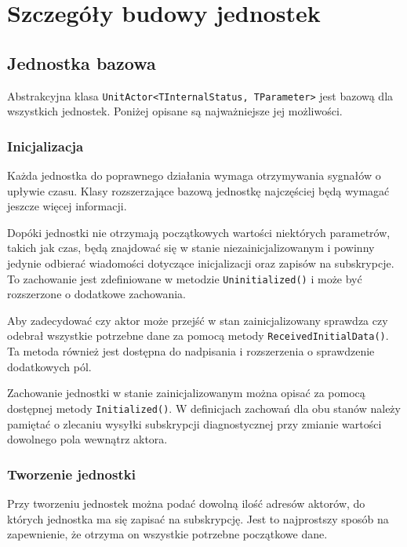 \chapter{Szczegóły budowy jednostek} \label{ch:unit}

\section{Jednostka bazowa}
Abstrakcyjna klasa \lstinline{UnitActor<TInternalStatus, TParameter>} jest bazową dla wszystkich jednostek. Poniżej opisane są najważniejsze jej możliwości.

\subsection*{Inicjalizacja}
Każda jednostka do poprawnego działania wymaga otrzymywania sygnałów o upływie czasu. Klasy rozszerzające bazową jednostkę najczęściej będą wymagać jeszcze więcej informacji. 

Dopóki jednostki nie otrzymają początkowych wartości niektórych parametrów, takich jak czas, będą znajdować się w stanie niezainicjalizowanym i powinny jedynie odbierać wiadomości dotyczące inicjalizacji oraz zapisów na subskrypcje.
To zachowanie jest zdefiniowane w metodzie \lstinline{Uninitialized()} i może być rozszerzone o dodatkowe zachowania.

Aby zadecydować czy aktor może przejść w stan zainicjalizowany sprawdza czy odebrał wszystkie potrzebne dane za pomocą metody \lstinline{ReceivedInitialData()}. Ta metoda również jest dostępna do nadpisania i rozszerzenia o sprawdzenie dodatkowych pól.

Zachowanie jednostki w stanie zainicjalizowanym można opisać za pomocą dostępnej metody \lstinline{Initialized()}. 
W definicjach zachowań dla obu stanów należy pamiętać o zlecaniu wysyłki subskrypcji diagnostycznej przy zmianie wartości dowolnego pola wewnątrz aktora.

\subsection*{Tworzenie jednostki}
Przy tworzeniu jednostek można podać dowolną ilość adresów aktorów, do których jednostka ma się zapisać na subskrypcję. Jest to najprostszy sposób na zapewnienie, że otrzyma on wszystkie potrzebne początkowe dane. 

